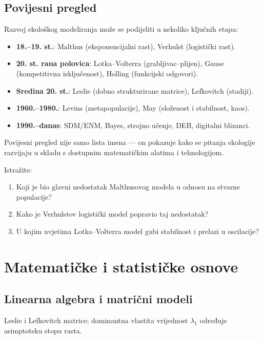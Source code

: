 \documentclass[12pt,oneside]{book}
\begin{document}
	\section{Povijesni pregled}
	\label{sec:povijesni-pregled}
	
	Razvoj ekološkog modeliranja može se podijeliti u nekoliko ključnih etapa:
	\begin{itemize}
		\item \textbf{18.–19. st.}: Malthus (eksponencijalni rast), Verhulst (logistički rast).
		\item \textbf{20. st. rana polovica}: Lotka–Volterra (grabljivac–plijen), Gause (kompetitivna isključenost), Holling (funkcijski odgovori).
		\item \textbf{Sredina 20. st.}: Leslie (dobno strukturirane matrice), Lefkovitch (stadiji).
		\item \textbf{1960.–1980.}: Levins (metapopulacije), May (složenost i stabilnost, kaos).
		\item \textbf{1990.–danas}: SDM/ENM, Bayes, strojno učenje, DEB, digitalni blizanci.
	\end{itemize}
	
	\begin{tcolorbox}[colback=blue!5,colframe=blue!70!black,title={Savjet}]
		Povijesni pregled nije samo lista imena --- on pokazuje kako se pitanja ekologije
		razvijaju u skladu s dostupnim matematičkim alatima i tehnologijom.
	\end{tcolorbox}
	
	\begin{tcolorbox}[colback=green!5,colframe=green!40!black,title={Zadatak 3}]
		Istražite:  
		\begin{enumerate}
			\item Koji je bio glavni nedostatak Malthusovog modela u odnosu na stvarne populacije?  
			\item Kako je Verhulstov logistički model popravio taj nedostatak?  
			\item U kojim uvjetima Lotka–Volterra model gubi stabilnost i prelazi u oscilacije?  
		\end{enumerate}
	\end{tcolorbox}
	
	
	\chapter{Matematičke i statističke osnove}
	\section{Linearna algebra i matrični modeli}
	Leslie i Lefkovitch matrice; dominantna vlastita vrijednost $\lambda_1$ određuje asimptotsku stopu rasta.
\end{document}
